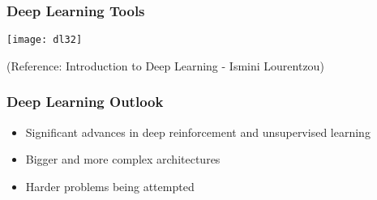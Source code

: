 \begin{frame}[fragile] \frametitle{Deep Learning Tools}
\begin{center}
\texttt{[image: dl32]}
\end{center}
\tiny{(Reference: Introduction to Deep Learning - Ismini Lourentzou)}
\end{frame}

\begin{frame}[fragile] \frametitle{Deep Learning Outlook}
\begin{itemize}
\item Significant advances in deep reinforcement and unsupervised learning
\item Bigger and more complex architectures
\item Harder problems being attempted
\end{itemize}
\end{frame}



